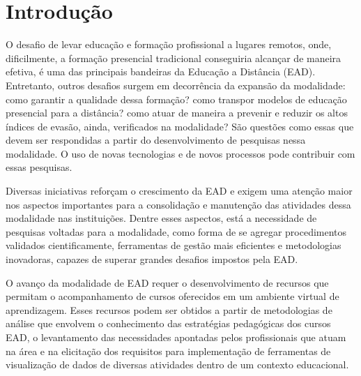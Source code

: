 \chapter{Introdução}

O desafio de levar educação e formação profissional a lugares remotos, onde,
dificilmente, a formação presencial tradicional conseguiria alcançar de maneira
efetiva, é uma das principais bandeiras da Educação a Distância (EAD).
Entretanto, outros desafios surgem em decorrência da expansão da modalidade:
como garantir a qualidade dessa formação? como transpor modelos de educação
presencial para a distância? como atuar de maneira a prevenir e reduzir os altos
índices de evasão, ainda, verificados na modalidade? São questões como essas que
devem ser respondidas a partir do desenvolvimento de pesquisas nessa modalidade.
O uso de novas tecnologias e de novos processos pode contribuir com essas
pesquisas.



Diversas iniciativas reforçam o crescimento da EAD e exigem uma atenção maior
nos aspectos importantes para a consolidação e manutenção das atividades dessa
modalidade nas instituições. Dentre esses aspectos, está a necessidade de
pesquisas voltadas para a modalidade, como forma de se agregar procedimentos
validados cientificamente, ferramentas de gestão mais eficientes e metodologias
inovadoras, capazes de superar grandes desafios impostos pela EAD.

O avanço da modalidade de EAD requer o desenvolvimento de recursos que permitam
o acompanhamento de cursos oferecidos em um ambiente virtual de aprendizagem.
Esses recursos podem ser obtidos a partir de metodologias de análise que
envolvem o conhecimento das estratégias pedagógicas dos cursos EAD, o
levantamento das necessidades apontadas pelos profissionais que atuam na área e
na elicitação dos requisitos para implementação de ferramentas de visualização
de dados de diversas atividades dentro de um contexto educacional.
\cite{ramos2016abordagem}

